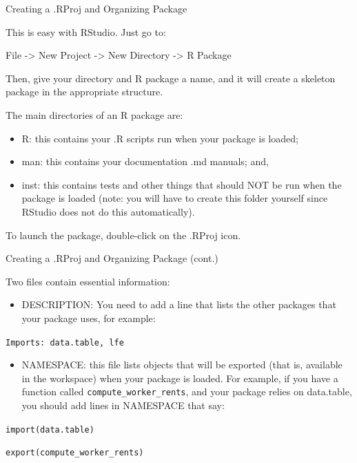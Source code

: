 \documentclass[10pt,ignorenonframetext,]{beamer}
\providecommand{\tightlist}{%
\setlength{\itemsep}{0pt}\setlength{\parskip}{0pt}}
\begin{document}
\begin{frame}{Creating a .RProj and Organizing Package}

This is easy with RStudio. Just go to:

File -\textgreater{} New Project -\textgreater{} New Directory
-\textgreater{} R Package

Then, give your directory and R package a name, and it will create a
skeleton package in the appropriate structure.

The main directories of an R package are:

\begin{itemize}
\tightlist
\item
  R: this contains your .R scripts run when your package is loaded;
\item
  man: this contains your documentation .md manuals; and,
\item
  inst: this contains tests and other things that should NOT be run when
  the package is loaded (note: you will have to create this folder
  yourself since RStudio does not do this automatically).
\end{itemize}

To launch the package, double-click on the .RProj icon.

\end{frame}

\begin{frame}[fragile]{Creating a .RProj and Organizing Package (cont.)}

Two files contain essential information:

\begin{itemize}
\tightlist
\item
  DESCRIPTION: You need to add a line that lists the other packages that
  your package uses, for example:
\end{itemize}

\texttt{Imports:\ data.table,\ lfe}

\begin{itemize}
\tightlist
\item
  NAMESPACE: this file lists objects that will be exported (that is,
  available in the workspace) when your package is loaded. For example,
  if you have a function called \texttt{compute\_worker\_rents}, and
  your package relies on data.table, you should add lines in NAMESPACE
  that say:
\end{itemize}

\texttt{import(data.table)}

\texttt{export(compute\_worker\_rents)}

\end{frame}
\end{document}

